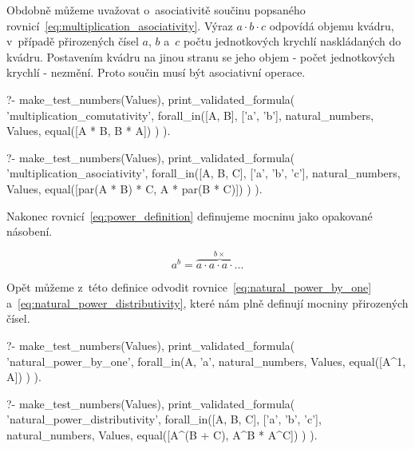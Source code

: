 Obdobně můžeme uvažovat o~asociativitě součinu popsaného rovnicí~\eqref{eq:multiplication_asociativity}. Výraz \(a \cdot b \cdot c\) odpovídá objemu kvádru, v~případě přirozených čísel \(a\), \(b\) a~\(c\) počtu jednotkových krychlí naskládaných do kvádru. Postavením kvádru na jinou stranu se jeho objem - počet jednotkových krychlí - nezmění. Proto součin musí být asociativní operace.

\begin{fact}
\begin{prolog}
?-	make_test_numbers(Values),
	print_validated_formula(
		'multiplication_comutativity',
		forall_in([A, B], ['a', 'b'], natural_numbers, Values,
			equal([A * B, B * A])
		)
	).				
\end{prolog}
\begin{prolog}
?-	make_test_numbers(Values),
	print_validated_formula(
		'multiplication_asociativity',
		forall_in([A, B, C], ['a', 'b', 'c'], natural_numbers, Values,
			equal([par(A * B) * C, A * par(B * C)])
		)
	).				
\end{prolog}
\end{fact}

Nakonec rovnicí~\eqref{eq:power_definition} definujeme mocninu jako opakované násobení.

\begin{equation}
\label{eq:power_definition}
a^b = \overbrace{a \cdot a \cdot a \cdot ...}^{b \times}
\end{equation}

Opět můžeme z~této definice odvodit rovnice~\eqref{eq:natural_power_by_one} a~\eqref{eq:natural_power_distributivity}, které nám plně definují mocniny přirozených čísel.

\begin{fact}
\begin{prolog}
?-	make_test_numbers(Values),
	print_validated_formula(
		'natural_power_by_one',
		forall_in(A, 'a', natural_numbers, Values,
			equal([A^1, A])
		)
	).				
\end{prolog}
\begin{prolog}
?-	make_test_numbers(Values),
	print_validated_formula(
		'natural_power_distributivity',
		forall_in([A, B, C], ['a', 'b', 'c'], natural_numbers, Values,
			equal([A^(B + C), A^B * A^C])
		)
	).				
\end{prolog}
\end{fact}

